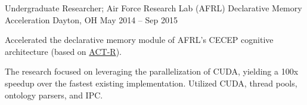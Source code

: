 \begin{cventries}

\cventry
{Undergraduate Researcher; Air Force Research Lab (AFRL)}
{Declarative Memory Acceleration}
{Dayton, OH}
{May 2014 – Sep 2015}
{
\begin{cvitems}
\item Accelerated the declarative memory module of AFRL's CECEP cognitive architecture (based on \href{http://act-r.psy.cmu.edu/}{ACT-R}).
\item The research focused on leveraging the parallelization of CUDA, yielding a 100x speedup over the fastest existing implementation. Utilized CUDA, thread pools, ontology parsers, and IPC.
\end{cvitems}
}


\end{cventries}